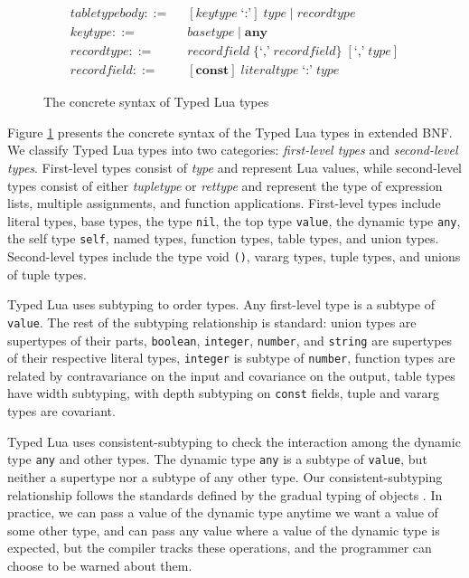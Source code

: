 \begin{figure}[!ht]
\begin{align*}
\textit{tabletypebody} ::= & \;\; [\textit{keytype} \; \texttt{`:'}] \; \textit{type} \; | \;
  \textit{recordtype}\\
\textit{keytype} ::= & \;\; \textit{basetype} \; | \;
  \textbf{any}\\
\textit{recordtype} ::= & \;\; \textit{recordfield} \; \{\texttt{`,'} \; \textit{recordfield}\} \; [\texttt{`,'} \; \textit{type}]\\
\textit{recordfield} ::= & \;\; [\textbf{const}] \; \textit{literaltype} \; \texttt{`:'} \; \textit{type}
\end{align*}
\dend
\caption{The concrete syntax of Typed Lua types}
\label{fig:types}
\end{figure}

Figure \ref{fig:types} presents the concrete syntax of the
Typed Lua types in extended BNF.
We classify Typed Lua types into two categories:
\emph{first-level types} and \emph{second-level types}.
First-level types consist of \emph{type} and represent Lua values,
while second-level types consist of either \emph{tupletype} or
\emph{rettype} and represent the type of expression lists,
multiple assignments, and function applications.
First-level types include literal types, base types, the type \texttt{nil},
the top type \texttt{value}, the dynamic type \texttt{any},
the self type \texttt{self}, named types, function types, table types,
and union types.
Second-level types include the type void \texttt{()},
vararg types, tuple types, and unions of tuple types.

Typed Lua uses subtyping to order types.
Any first-level type is a subtype of \texttt{value}.
The rest of the subtyping relationship is standard:
union types are supertypes of their parts,
\texttt{boolean}, \texttt{integer}, \texttt{number}, and \texttt{string}
are supertypes of their respective literal types,
\texttt{integer} is subtype of \texttt{number},
function types are related by contravariance on the input
and covariance on the output, table types have width subtyping,
with depth subtyping on \texttt{const} fields, tuple and vararg types
are covariant.

Typed Lua uses consistent-subtyping to check the interaction among the
dynamic type \texttt{any} and other types.
The dynamic type \texttt{any} is a subtype of \texttt{value}, but neither
a supertype nor a subtype of any other type.
Our consistent-subtyping relationship follows the standards defined
by the gradual typing of objects \citep{siek2007objects,siek2013mutable}.
In practice, we can pass a value of the dynamic type anytime we want
a value of some other type, and can pass any value where a
value of the dynamic type is expected, but the compiler tracks these
operations, and the programmer can choose to be warned about them.

